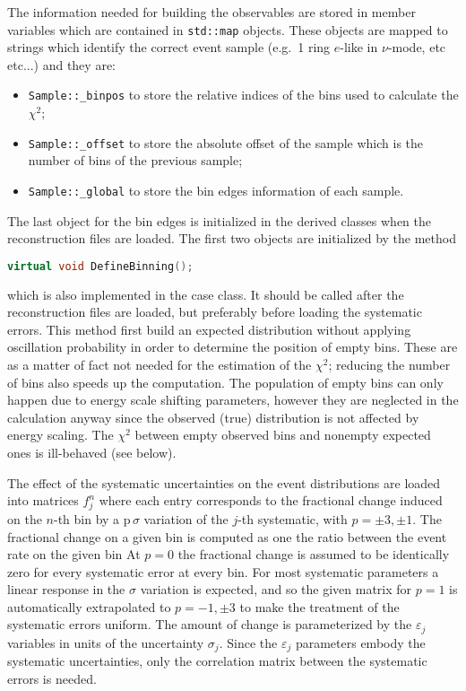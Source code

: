 \documentclass[a4paper, 11pt]{article}
\begin{document}
The information needed for building the observables are stored in member variables which are contained in \texttt{std::map} objects.
These objects are mapped to strings which identify the correct event sample (e.g.\ 1 ring $e$-like in $\nu$-mode, etc etc...) and they are:
\begin{itemize}
	\item \texttt{Sample::\_binpos} to store the relative indices of the bins used to calculate the $\chi^2$;
	\item \texttt{Sample::\_offset} to store the absolute offset of the sample which is the number of bins of the previous sample;
	\item \texttt{Sample::\_global} to store the bin edges information of each sample.
\end{itemize}
The last object for the bin edges is initialized in the derived classes when the reconstruction files are loaded.
The first two objects are initialized by the method
\begin{lstlisting}[language=C++]
    virtual void DefineBinning();
\end{lstlisting}
which is also implemented in the case class.
It should be called after the reconstruction files are loaded, but preferably before loading the systematic errors.
This method first build an expected distribution without applying oscillation probability in order to determine the position of empty bins.
These are as a matter of fact not needed for the estimation of the $\chi^2$; reducing the number of bins also speeds up the computation.
The population of empty bins can only happen due to energy scale shifting parameters, however they are neglected in the calculation %
anyway since the observed (true) distribution is not affected by energy scaling.
The $\chi^2$ between empty observed bins and nonempty expected ones is ill-behaved (see below).

The effect of the systematic uncertainties on the event distributions are loaded into matrices $f_j^n$ %
where each entry corresponds to the fractional change induced on the $n$-th bin by a p\,$\sigma$ variation of the $j$-th systematic, %
with $p = \pm3, \pm1$.
The fractional change on a given bin is computed as one the ratio between the event rate on the given bin
At $p=0$ the fractional change is assumed to be identically zero for every systematic error at every bin.
For most systematic parameters a linear response in the $\sigma$ variation is expected, and so %
the given matrix for $p=1$ is automatically extrapolated to $p=-1, \pm3$ to make the treatment of the systematic errors uniform.
The amount of change is parameterized by the $\varepsilon_j$ variables in units of the uncertainty $\sigma_j$.
Since the $\varepsilon_j$ parameters embody the systematic uncertainties, only the correlation matrix between the systematic errors is needed.
\end{document}
